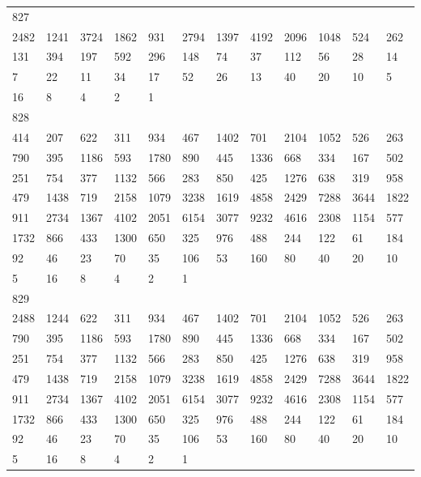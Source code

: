 \begin{longtable}{llllllllllll}
827&&&&&&&&&&&\\
2482& 1241& 3724& 1862& 931& 2794& 1397& 4192& 2096& 1048& 524& 262\\
131& 394& 197& 592& 296& 148& 74& 37& 112& 56& 28& 14\\
7& 22& 11& 34& 17& 52& 26& 13& 40& 20& 10& 5\\
16& 8& 4& 2& 1& \\

828&&&&&&&&&&&\\
414& 207& 622& 311& 934& 467& 1402& 701& 2104& 1052& 526& 263\\
790& 395& 1186& 593& 1780& 890& 445& 1336& 668& 334& 167& 502\\
251& 754& 377& 1132& 566& 283& 850& 425& 1276& 638& 319& 958\\
479& 1438& 719& 2158& 1079& 3238& 1619& 4858& 2429& 7288& 3644& 1822\\
911& 2734& 1367& 4102& 2051& 6154& 3077& 9232& 4616& 2308& 1154& 577\\
1732& 866& 433& 1300& 650& 325& 976& 488& 244& 122& 61& 184\\
92& 46& 23& 70& 35& 106& 53& 160& 80& 40& 20& 10\\
5& 16& 8& 4& 2& 1& \\

829&&&&&&&&&&&\\
2488& 1244& 622& 311& 934& 467& 1402& 701& 2104& 1052& 526& 263\\
790& 395& 1186& 593& 1780& 890& 445& 1336& 668& 334& 167& 502\\
251& 754& 377& 1132& 566& 283& 850& 425& 1276& 638& 319& 958\\
479& 1438& 719& 2158& 1079& 3238& 1619& 4858& 2429& 7288& 3644& 1822\\
911& 2734& 1367& 4102& 2051& 6154& 3077& 9232& 4616& 2308& 1154& 577\\
1732& 866& 433& 1300& 650& 325& 976& 488& 244& 122& 61& 184\\
92& 46& 23& 70& 35& 106& 53& 160& 80& 40& 20& 10\\
5& 16& 8& 4& 2& 1& \\


\end{longtable}
